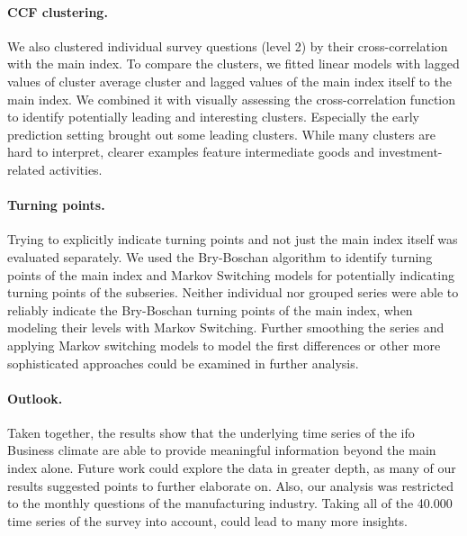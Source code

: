 \paragraph{CCF clustering.}
We also clustered individual survey questions (level 2) by their cross-correlation with the main index. To compare the clusters, we fitted linear models with lagged values of cluster average cluster and lagged values of the main index itself to the main index. We combined it with visually assessing the cross-correlation function to identify potentially leading and interesting clusters. 
Especially the early prediction setting brought out some leading clusters. While many clusters are hard to interpret, clearer examples feature intermediate goods and investment-related activities. 

\paragraph{Turning points.}
Trying to explicitly indicate turning points and not just the main index itself was evaluated separately. We used the Bry-Boschan algorithm to identify turning points of the main index and Markov Switching models for potentially indicating turning points of the subseries. Neither individual nor grouped series were able to reliably indicate the Bry-Boschan turning points of the main index, when modeling their levels with Markov Switching. Further smoothing the series and applying Markov switching models to model the first differences or other more sophisticated approaches could be examined in further analysis. 

\paragraph{Outlook.}
Taken together, the results show that the underlying time series of the ifo Business climate are able to provide meaningful information beyond the main index alone. Future work could explore the data in greater depth, as many of our results suggested points to further elaborate on. Also, our analysis was restricted to the monthly questions of the manufacturing industry. Taking all of the 40.000 time series of the survey into account, could lead to many more insights. 


